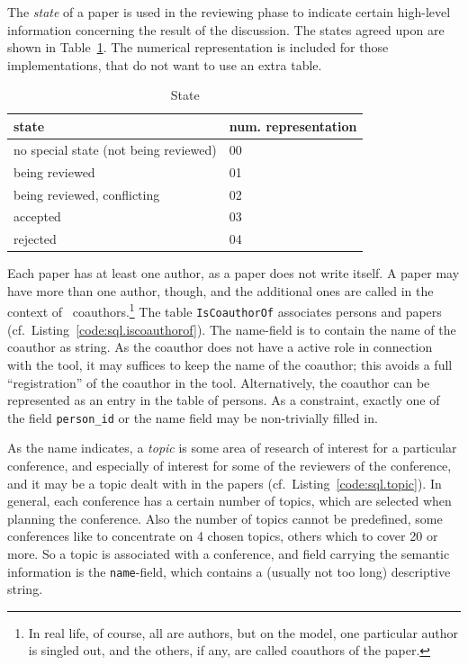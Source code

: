 %

The \emph{state} of a paper is used in the reviewing phase to indicate
certain high-level information concerning the result of the discussion.
 The states agreed upon are shown in
Table~\ref{tab:paper.state}. The numerical representation is included for
those implementations, that do not want to use an extra table.



\begin{table}[htbp]
  \centering
  \begin{tabular}{ll}
    state & num. representation
    \\\hline
    no special state (not being reviewed) & 00
    \\
    being reviewed
    & 
    01
    \\
    being reviewed, conflicting
    &
    02
    \\
    accepted
    &
    03
    \\
    rejected
    &
    04
  \end{tabular}
  \caption{State}
  \label{tab:paper.state}
\end{table}


Each paper has at least one author, as a paper does not write itself. A paper
may have more than one author, though, and the additional ones are called in
the context of \Coma\ coauthors.\footnote{In real life, of course, all are
  authors, but on the model, one particular author is singled out, and the
  others, if any, are called coauthors of the paper.} 
%
The table \texttt{IsCoauthorOf} associates persons and papers (cf.\ 
Listing~\ref{code:sql.iscoauthorof}). The name-field is to contain the name of
the coauthor as string.  As the coauthor does not have a active role in
connection with the tool, it may suffices to keep the name of the coauthor;
this avoids a full ``registration'' of the coauthor in the tool.
Alternatively, the coauthor can be represented as an entry in the table of
persons. As a constraint, exactly one of the field \texttt{person\_id} or the
name field may be non-trivially filled in.

%

%

%
As the name indicates, a \emph{topic} is some area of research of interest for
a particular conference, and especially of interest for some of the reviewers
of the conference, and it may be a topic dealt with in the papers (cf.\ 
Listing~\ref{code:sql.topic}). In general, each conference has a certain
number of topics, which are selected when planning the conference.  Also the
number of topics cannot be predefined, some conferences like to concentrate on
4 chosen topics, others which to cover 20 or more. So a topic is associated
with a conference, and field carrying the semantic information is the
\texttt{name}-field, which contains a (usually not too long) descriptive
string. 

